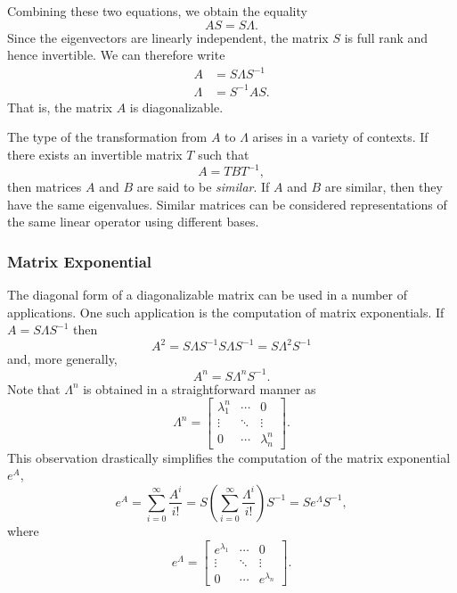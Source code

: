Combining these two equations, we obtain the equality
\begin{equation*}
A S = S \Lambda .
\end{equation*}
Since the eigenvectors are linearly independent, the matrix $S$ is full rank and hence invertible.
We can therefore write
\begin{align*}
A &= S \Lambda S^{-1} \\
\Lambda &= S^{-1} A S .
\end{align*}
That is, the matrix $A$ is diagonalizable.

The type of the transformation from $A$ to $\Lambda$ arises in a variety of contexts.
If there exists an invertible matrix $T$ such that
\begin{equation*}
A = T B T^{-1},
\end{equation*}
then matrices $A$ and $B$ are said to be \emph{similar}.
If $A$ and $B$ are similar, then they have the same eigenvalues.
Similar matrices can be considered representations of the same linear operator using different bases.

\subsubsection{Matrix Exponential}

The diagonal form of a diagonalizable matrix can be used in a number of applications.
One such application is the computation of matrix exponentials.
If $A = S \Lambda S^{-1}$ then
\begin{equation*}
A^2 = S \Lambda S^{-1} S \Lambda S^{-1}
= S \Lambda^2 S^{-1}
\end{equation*}
and, more generally,
\begin{equation*}
A^n = S \Lambda^n S^{-1}.
\end{equation*}
Note that $\Lambda^n$ is obtained in a straightforward manner as
\begin{equation*}
\Lambda^n = \left[ \begin{array}{ccc}
\lambda_1^n & \cdots & 0 \\
\vdots & \ddots & \vdots \\
0 & \cdots & \lambda_n^n
\end{array} \right] .
\end{equation*}
This observation drastically simplifies the computation of the matrix exponential $e^A$,
\begin{equation*}
e^A = \sum_{i=0}^{\infty} \frac{A^i}{i!}
= S \left( \sum_{i=0}^{\infty} \frac{\Lambda^i}{i!} \right) S^{-1}
= S e^{\Lambda} S^{-1},
\end{equation*}
where
\begin{equation*}
e^{\Lambda} = \left[ \begin{array}{ccc}
e^{\lambda_1} & \cdots & 0 \\
\vdots & \ddots & \vdots \\
0 & \cdots & e^{\lambda_n}
\end{array} \right] .
\end{equation*}

